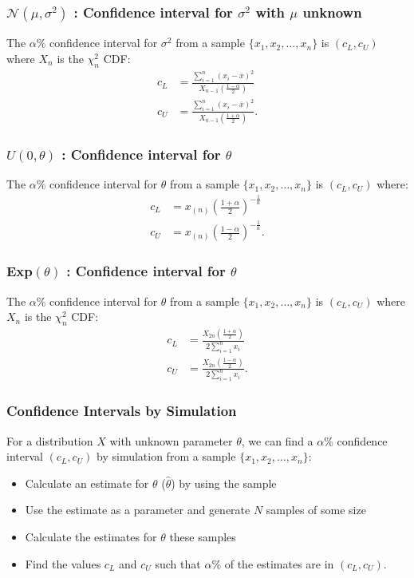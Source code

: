 \documentclass[a4paper, 12pt, twoside]{article}
\begin{document}
\subsubsection{$\mathcal{N}(\mu, \sigma^2)$ : Confidence 
interval for $\sigma^2$ with $\mu$ unknown}

The $\alpha\%$ confidence interval for $\sigma^2$ from a sample 
$\{x_1, x_2, \ldots, x_n\}$ is $(c_L, c_U)$ where $X_n$ is the
$\chi^2_n$ CDF:
\begin{align*}
    c_L &= \frac{\sum_{i = 1}^n(x_i - \overline{x})^2}
    {X_{n-1}\left(\frac{1 - \alpha}{2}\right)} \\
    c_U &= \frac{\sum_{i = 1}^n(x_i - \overline{x})^2}
    {X_{n-1}\left(\frac{1 + \alpha}{2}\right)}.
\end{align*}

\subsubsection{$U(0, \theta)$ : Confidence interval for $\theta$}

The $\alpha\%$ confidence interval for $\theta$ from a sample 
$\{x_1, x_2, \ldots, x_n\}$ is $(c_L, c_U)$ where:
\begin{align*}
    c_L &= x_{(n)}\left(\frac{1 + \alpha}{2}\right)^{-\frac{1}{n}} \\
    c_U &= x_{(n)}\left(\frac{1 - \alpha}{2}\right)^{-\frac{1}{n}}.
\end{align*}

\subsubsection{Exp$(\theta)$ : Confidence interval for $\theta$}

The $\alpha\%$ confidence interval for $\theta$ from a sample 
$\{x_1, x_2, \ldots, x_n\}$ is $(c_L, c_U)$ where $X_n$ is the
$\chi^2_n$ CDF:
\begin{align*}
    c_L &= \frac{X_{2n}\left(\frac{1 + \alpha}{2}\right)}
    {2\sum_{i = 1}^n x_i} \\
    c_U &= \frac{X_{2n}\left(\frac{1 - \alpha}{2}\right)}
    {2\sum_{i = 1}^n x_i}.
\end{align*}

\subsubsection{Confidence Intervals by Simulation}

For a distribution $X$ with unknown parameter $\theta$, we can
find a $\alpha\%$ confidence interval $(c_L, c_U)$ by simulation from 
a sample $\{x_1, x_2, \ldots, x_n\}$:

\begin{itemize}
    \item Calculate an estimate for $\theta$ ($\hat\theta$) by using the
    sample
    \item Use the estimate as a parameter and generate $N$ samples of 
    some size
    \item Calculate the estimates for $\theta$ these samples
    \item Find the values $c_L$ and $c_U$ such that $\alpha\%$ of
    the estimates are in $(c_L, c_U)$.
\end{itemize}
\end{document}
